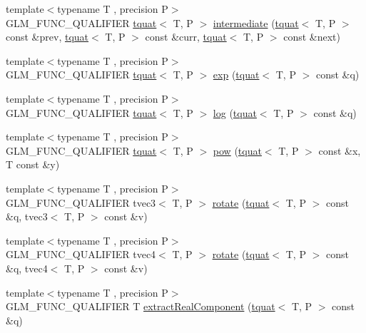 \begin{DoxyCompactItemize}
\item 
{\footnotesize template$<$typename T , precision P$>$ }\\G\+L\+M\+\_\+\+F\+U\+N\+C\+\_\+\+Q\+U\+A\+L\+I\+F\+I\+E\+R \hyperlink{structglm_1_1tquat}{tquat}$<$ T, P $>$ \hyperlink{group__gtx__quaternion_ga56abae85b3669c866e91f3c57b298b9c}{intermediate} (\hyperlink{structglm_1_1tquat}{tquat}$<$ T, P $>$ const \&prev, \hyperlink{structglm_1_1tquat}{tquat}$<$ T, P $>$ const \&curr, \hyperlink{structglm_1_1tquat}{tquat}$<$ T, P $>$ const \&next)
\item 
{\footnotesize template$<$typename T , precision P$>$ }\\G\+L\+M\+\_\+\+F\+U\+N\+C\+\_\+\+Q\+U\+A\+L\+I\+F\+I\+E\+R \hyperlink{structglm_1_1tquat}{tquat}$<$ T, P $>$ \hyperlink{group__gtx__quaternion_ga17295173d4c2b5ae49b84e9993b63a62}{exp} (\hyperlink{structglm_1_1tquat}{tquat}$<$ T, P $>$ const \&q)
\item 
{\footnotesize template$<$typename T , precision P$>$ }\\G\+L\+M\+\_\+\+F\+U\+N\+C\+\_\+\+Q\+U\+A\+L\+I\+F\+I\+E\+R \hyperlink{structglm_1_1tquat}{tquat}$<$ T, P $>$ \hyperlink{group__gtx__quaternion_ga791f42e134bfe97fc9c96f4668dd7489}{log} (\hyperlink{structglm_1_1tquat}{tquat}$<$ T, P $>$ const \&q)
\item 
{\footnotesize template$<$typename T , precision P$>$ }\\G\+L\+M\+\_\+\+F\+U\+N\+C\+\_\+\+Q\+U\+A\+L\+I\+F\+I\+E\+R \hyperlink{structglm_1_1tquat}{tquat}$<$ T, P $>$ \hyperlink{group__gtx__quaternion_ga42a0cf206c59eaeff4c67dd62e09a580}{pow} (\hyperlink{structglm_1_1tquat}{tquat}$<$ T, P $>$ const \&x, T const \&y)
\item 
{\footnotesize template$<$typename T , precision P$>$ }\\G\+L\+M\+\_\+\+F\+U\+N\+C\+\_\+\+Q\+U\+A\+L\+I\+F\+I\+E\+R tvec3$<$ T, P $>$ \hyperlink{group__gtx__quaternion_ga9f39f0d3ecd66839a4af44560aa10fb2}{rotate} (\hyperlink{structglm_1_1tquat}{tquat}$<$ T, P $>$ const \&q, tvec3$<$ T, P $>$ const \&v)
\item 
{\footnotesize template$<$typename T , precision P$>$ }\\G\+L\+M\+\_\+\+F\+U\+N\+C\+\_\+\+Q\+U\+A\+L\+I\+F\+I\+E\+R tvec4$<$ T, P $>$ \hyperlink{group__gtx__quaternion_ga96575f8868b3f2aa3e13cab9b94ccbd3}{rotate} (\hyperlink{structglm_1_1tquat}{tquat}$<$ T, P $>$ const \&q, tvec4$<$ T, P $>$ const \&v)
\item 
{\footnotesize template$<$typename T , precision P$>$ }\\G\+L\+M\+\_\+\+F\+U\+N\+C\+\_\+\+Q\+U\+A\+L\+I\+F\+I\+E\+R T \hyperlink{group__gtx__quaternion_ga90de879d97487ec804522dd418e5d8a0}{extract\+Real\+Component} (\hyperlink{structglm_1_1tquat}{tquat}$<$ T, P $>$ const \&q)

\end{DoxyCompactItemize}
